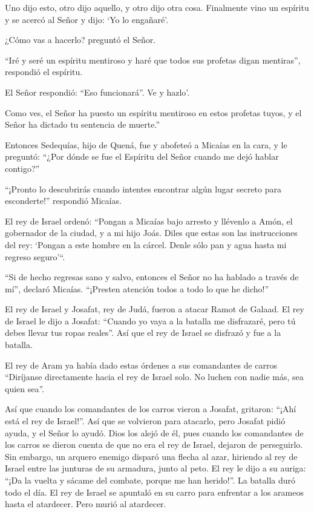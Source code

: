 Uno dijo esto, otro dijo aquello, y otro dijo otra cosa. 
Finalmente vino un espíritu y se acercó al Señor y dijo: `Yo lo
engañaré'.

¿Cómo vas a hacerlo? preguntó el Señor.

 ``Iré y seré un espíritu mentiroso y haré que todos sus
profetas digan mentiras'', respondió el espíritu.

El Señor respondió: ``Eso funcionará''. Ve y hazlo'.

 Como ves, el Señor ha puesto un espíritu mentiroso en
estos profetas tuyos, y el Señor ha dictado tu sentencia de muerte.''

 Entonces Sedequías, hijo de Quená, fue y abofeteó a
Micaías en la cara, y le preguntó: ``¿Por dónde se fue el Espíritu del
Señor cuando me dejó hablar contigo?''

 ``¡Pronto lo descubrirás cuando intentes encontrar algún
lugar secreto para esconderte!'' respondió Micaías.

 El rey de Israel ordenó: ``Pongan a Micaías bajo arresto y
llévenlo a Amón, el gobernador de la ciudad, y a mi hijo Joás.
 Diles que estas son las instrucciones del rey: `Pongan a
este hombre en la cárcel. Denle sólo pan y agua hasta mi regreso
seguro'``.

 ``Si de hecho regresas sano y salvo, entonces el Señor no
ha hablado a través de mí'', declaró Micaías. ``¡Presten atención todos
a todo lo que he dicho!''

 El rey de Israel y Josafat, rey de Judá, fueron a atacar
Ramot de Galaad.  El rey de Israel le dijo a Josafat:
``Cuando yo vaya a la batalla me disfrazaré, pero tú debes llevar tus
ropas reales''. Así que el rey de Israel se disfrazó y fue a la batalla.

 El rey de Aram ya había dado estas órdenes a sus
comandantes de carros ``Diríjanse directamente hacia el rey de Israel
solo. No luchen con nadie más, sea quien sea''.

 Así que cuando los comandantes de los carros vieron a
Josafat, gritaron: ``¡Ahí está el rey de Israel!''. Así que se volvieron
para atacarlo, pero Josafat pidió ayuda, y el Señor lo ayudó. Dios los
alejó de él,  pues cuando los comandantes de los carros se
dieron cuenta de que no era el rey de Israel, dejaron de perseguirlo.
 Sin embargo, un arquero enemigo disparó una flecha al
azar, hiriendo al rey de Israel entre las junturas de su armadura, junto
al peto. El rey le dijo a su auriga: ``¡Da la vuelta y sácame del
combate, porque me han herido!''.  La batalla duró todo el
día. El rey de Israel se apuntaló en su carro para enfrentar a los
arameos hasta el atardecer. Pero murió al atardecer.

